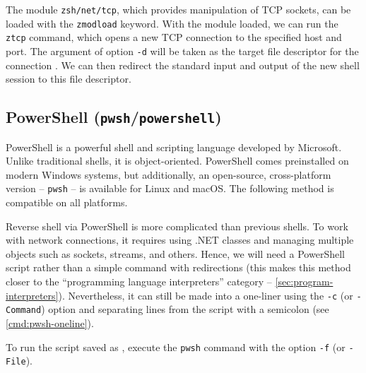 The module \texttt{zsh/net/tcp}, which provides manipulation of TCP sockets, can be loaded with the \texttt{zmodload} keyword. With the module loaded, we can run the \texttt{ztcp} command, which opens a new TCP connection to the specified host and port. The argument of option \texttt{-d} will be taken as the target file descriptor for the connection \cite{zsh-net-tcp-doc}. We can then redirect the standard input and output of the new shell session to this file descriptor.

\newpage



\subsection{PowerShell (\texttt{pwsh}/\texttt{powershell})}


PowerShell is a powerful shell and scripting language developed by Microsoft. Unlike traditional shells, it is object-oriented. PowerShell comes preinstalled on modern Windows systems, but additionally, an open-source, cross-platform version -- \texttt{pwsh} -- is available for Linux and macOS. The following method is compatible on all platforms.

Reverse shell via PowerShell is more complicated than previous shells. To work with network connections, it requires using .NET classes and managing multiple objects such as sockets, streams, and others. Hence, we will need a PowerShell script rather than a simple command with redirections (this makes this method closer to the ``programming language interpreters'' category -- \cref{sec:program-interpreters}). Nevertheless, it can still be made into a one-liner using the \texttt{-c} (or \texttt{-Command}) option and separating lines from the script with a semicolon (see \cref{cmd:pwsh-oneline}).


To run the script saved as \scriptfile , execute the \texttt{pwsh} command with the option \texttt{-f} (or \texttt{-File}).


